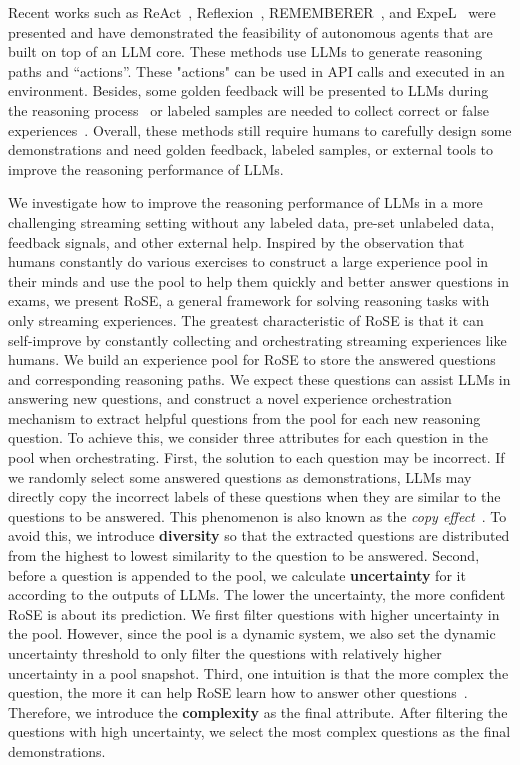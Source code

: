 \documentclass[11pt]{article}
\begin{document}
Recent works such as ReAct~\cite{yao2023react}, Reflexion~\cite{shinn203reflexion}, REMEMBERER~\cite{zhang2023rememberer}, and ExpeL~\cite{zhao2023expel} were presented and have demonstrated the feasibility of autonomous agents that are built on top of an LLM core. These methods use LLMs to generate reasoning paths and “actions”. These "actions" can be used in API calls and executed in an environment. Besides, some golden feedback will be presented to LLMs during the reasoning process~\cite{shinn203reflexion,zhang2023rememberer} or labeled samples are needed to collect correct or false experiences~\cite{zhao2023expel}. Overall, these methods still require humans to carefully design some demonstrations and need golden feedback, labeled samples, or external tools to improve the reasoning performance of LLMs. 

We investigate how to improve the reasoning performance of LLMs in a more challenging streaming setting without any labeled data, pre-set unlabeled data, feedback signals, and other external help. Inspired by the observation that humans constantly do various exercises to construct a large experience pool in their minds and use the pool to help them quickly and better answer questions in exams, we present RoSE, a general framework for solving reasoning tasks with only streaming experiences. The greatest characteristic of RoSE is that it can self-improve by constantly collecting and orchestrating streaming experiences like humans. We build an experience pool for RoSE to store the answered questions and corresponding reasoning paths. We expect these questions can assist LLMs in answering new questions, and construct a novel experience orchestration mechanism to extract helpful questions from the pool for each new reasoning question. To achieve this, we consider three attributes for each question in the pool when orchestrating. First, the solution to each question may be incorrect. If we randomly select some answered questions as demonstrations, LLMs may directly copy the incorrect labels of these questions when they are similar to the questions to be answered. This phenomenon is also known as the \textit{copy effect}~\cite{lyu2023z-icl,zhang2033auto-cot}. To avoid this, we introduce \textbf{diversity} so that the extracted questions are distributed from the highest to lowest similarity to the question to be answered. Second, before a question is appended to the pool, we calculate \textbf{uncertainty} for it according to the outputs of LLMs. The lower the uncertainty, the more confident RoSE is about its prediction. We first filter questions with higher uncertainty in the pool. However, since the pool is a dynamic system, we also set the dynamic uncertainty threshold to only filter the questions with relatively higher uncertainty in a pool snapshot. Third, one intuition is that the more complex the question, the more it can help RoSE learn how to answer other questions~\cite{fu2023complexity}. Therefore, we introduce the \textbf{complexity} as the final attribute. After filtering the questions with high uncertainty, we select the most complex questions as the final demonstrations. 
\end{document}
